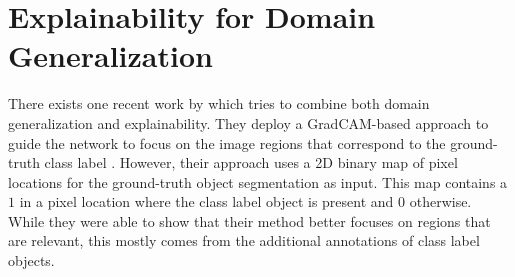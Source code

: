 \section{Explainability for Domain Generalization}

There exists one recent work by \citet{zunino2020explainable} which tries to combine both domain generalization and explainability. They deploy a GradCAM-based approach to guide the network to focus on the image regions that correspond to the ground-truth class label \citep{zunino2020explainable}. However, their approach uses a 2D binary map of pixel locations for the ground-truth object segmentation as input. This map contains a $1$ in a pixel location where the class label object is present and $0$ otherwise. While they were able to show that their method better focuses on regions that are relevant, this mostly comes from the additional annotations of class label objects. 